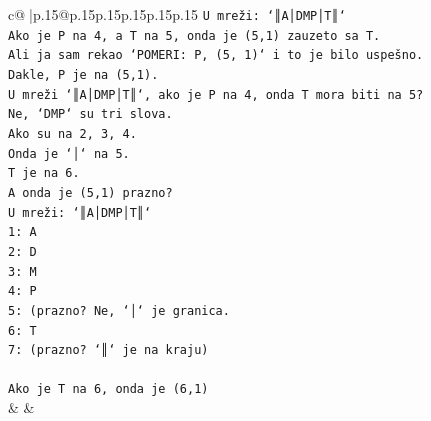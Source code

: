 \documentclass{article}
\begin{document}
{\begin{supertabular}{c@{$\;$}|p{.15\linewidth}@{}p{.15\linewidth}p{.15\linewidth}p{.15\linewidth}p{.15\linewidth}p{.15\linewidth}}
{{{\texttt{U mreži: `║A│DMP│T║`} \\
\texttt{Ako je P na 4, a T na 5, onda je (5,1) zauzeto sa T.} \\
\texttt{Ali ja sam rekao `POMERI: P, (5, 1)` i to je bilo uspešno.} \\
\texttt{Dakle, P je na (5,1).} \\
\texttt{U mreži `║A│DMP│T║`, ako je P na 4, onda T mora biti na 5?} \\
\texttt{Ne, `DMP` su tri slova.} \\
\texttt{Ako su na 2, 3, 4.} \\
\texttt{Onda je `│` na 5.} \\
\texttt{T je na 6.} \\
\texttt{A onda je (5,1) prazno?} \\
\texttt{U mreži: `║A│DMP│T║`} \\
\texttt{1: A} \\
\texttt{2: D} \\
\texttt{3: M} \\
\texttt{4: P} \\
\texttt{5: (prazno? Ne, `│` je granica.} \\
\texttt{6: T} \\
\texttt{7: (prazno? `║` je na kraju)} \\
\\ 
\texttt{Ako je T na 6, onda je (6,1)} \\
            }
        }
    }
    & & \\ \\


\end{supertabular}}
\end{document}
